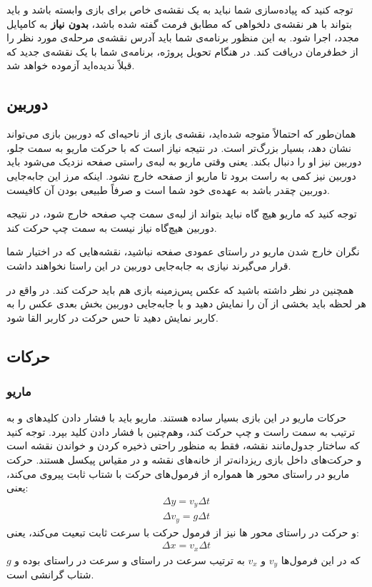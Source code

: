 \documentclass{utap}
\begin{document}
توجه کنید که پیاده‌سازی شما نباید به یک نقشه‌ی خاص برای بازی وابسته باشد و باید بتواند با هر نقشه‌ی دلخواهی که مطابق فرمت گفته شده باشد، \textbf{بدون نیاز} به کامپایل مجدد، اجرا شود. به این  منظور برنامه‌ی شما باید آدرس نقشه‌ی مرحله‌ی مورد نظر را از خط‌فرمان دریافت کند. در هنگام تحویل پروژه، برنامه‌ی شما با یک نقشه‌ی جدید که قبلاً ندیده‌اید آزموده خواهد شد.

	\subsection{دوربین}
همان‌طور که  احتمالاً متوجه شده‌اید، نقشه‌ی بازی از ناحیه‌ای که دوربین بازی می‌تواند نشان دهد، بسیار بزرگ‌تر است. در نتیجه نیاز است که با حرکت ماریو به سمت جلو، دوربین نیز او را دنبال بکند. یعنی وقتی ماریو به لبه‌ی راستی صفحه نزدیک می‌شود باید دوربین نیز کمی به راست برود تا ماریو از صفحه خارج نشود. اینکه مرز این جابه‌جایی دوربین چقدر باشد به عهده‌ی خود شما است و صرفاً طبیعی بودن آن کافیست.

توجه کنید که ماریو هیچ گاه نباید بتواند از لبه‌ی سمت چپ صفحه خارج شود، در نتیجه دوربین هیچ‌گاه نیاز نیست به سمت چپ حرکت کند.

نگران خارج شدن ماریو در راستای عمودی صفحه نباشید، نقشه‌هایی که در اختیار شما قرار می‌گیرند نیازی به جابه‌جایی دوربین در این راستا نخواهند داشت.

همچنین در نظر داشته باشید که عکس پس‌زمینه بازی هم باید حرکت کند. در واقع در هر لحظه باید بخشی از آن را نمایش دهید و با جابه‌جایی دوربین بخش بعدی عکس را به کاربر نمایش دهید تا حس حرکت در کاربر القا شود.
	\subsection{حرکات}
		\subsubsection{ماریو}
حرکات ماریو در این بازی بسیار ساده هستند. ماریو باید با فشار دادن کلید‌های  و  به ترتیب به سمت راست و چپ حرکت کند، وهم‌چنین با فشار دادن کلید  بپرد. توجه کنید که ساختار جدول‌مانند نقشه، فقط به منظور راحتی ذخیره کردن و خواندن نقشه است و حرکت‌های داخل بازی ریزدانه‌تر از خانه‌های نقشه و در مقیاس پیکسل هستند. حرکت ماریو در راستای محور ‌ها همواره از فرمول‌های حرکت با شتاب ثابت پیروی می‌کند، یعنی:
	\begin{gather*}
		\Delta y = v_y \Delta t\\
		\Delta v_y = g \Delta t
	\end{gather*}
و حرکت در راستای محور ‌ها نیز از فرمول حرکت با سرعت ثابت تبعیت می‌کند، یعنی:
	\begin{gather*}
		\Delta x = v_x \Delta t
	\end{gather*}
که در این فرمول‌ها $v_y$ و $v_x$ به ترتیب سرعت در راستای  و سرعت در راستای  بوده و $g$ شتاب گرانشی است.
\end{document}
